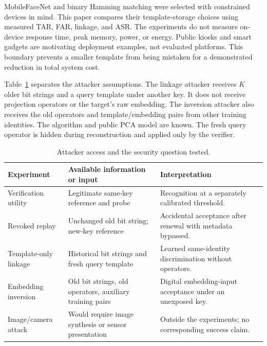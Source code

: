 MobileFaceNet and binary Hamming matching were selected with constrained devices in mind. This paper compares their template-storage choices using measured TAR, FAR, linkage, and ASR. The experiments do not measure on-device response time, peak memory, power, or energy. Public kiosks and smart gadgets are motivating deployment examples, not evaluated platforms. This boundary prevents a smaller template from being mistaken for a demonstrated reduction in total system cost.


Table~\ref{tab:threat} separates the attacker assumptions. The linkage attacker receives $K$ older bit strings and a query template under another key. It does not receive projection operators or the target's raw embedding. The inversion attacker also receives the old operators and template/embedding pairs from other training identities. The algorithm and public PCA model are known. The fresh query operator is hidden during reconstruction and applied only by the verifier.

\begin{table}[t]
\caption{Attacker access and the security question tested.}
\label{tab:threat}\centering\small
\begin{tabularx}{\textwidth}{@{}>{\raggedright\arraybackslash}p{2.3cm}>{\raggedright\arraybackslash}p{4.5cm}>{\raggedright\arraybackslash}X@{}}\toprule
Experiment & Available information or input & Interpretation \\\midrule
Verification utility & Legitimate same-key reference and probe & Recognition at a separately calibrated threshold.\\
Revoked replay & Unchanged old bit string; new-key reference & Accidental acceptance after renewal with metadata bypassed.\\
Template-only linkage & Historical bit strings and fresh query template & Learned same-identity discrimination without operators.\\
Embedding inversion & Old bit strings, old operators, auxiliary training pairs & Digital embedding-input acceptance under an unexposed key.\\
Image/camera attack & Would require image synthesis or sensor presentation & Outside the experiments; no corresponding success claim.\\\bottomrule
\end{tabularx}
\end{table}

